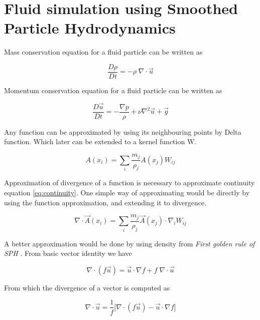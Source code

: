 \chapter{Fluid simulation using Smoothed Particle Hydrodynamics}
\label{cha:fluid-simul-using}

Mass conservation equation for a fluid particle can be written as

\begin{equation}
  \label{eq:continuity}
  \frac{D\rho}{Dt} = - \rho \; \nabla \cdot \vec{u}
\end{equation}



Momentum conservation equation for a fluid particle can be written as

\begin{equation}
  \label{eq:momentum}
  \frac{D\vec{u}}{Dt} = - \frac{\nabla p}{\rho} + \nu
  \nabla^2{\vec{u}} + \vec{g}
\end{equation}



Any function can be approximated by using its neighbouring points by Delta
function. Which later can be extended to a kernel function W.



\begin{equation}
  \label{eq:f_app}
  A(x_i) = \sum_i \frac{m_j}{\rho_j} A(x_j) W_{ij}
\end{equation}


Approximation of divergence of a function is necessary to approximate
continuity equation \eqref{eq:continuity}.  One simple way of approximating would
be directly by using the function approximation, and extending it to divergence.

\begin{equation*}
  \nabla \cdot \vec{A}(x_i) = \sum_i \frac{m_j}{\rho_j}
  \vec{A}(x_j) \cdot \nabla_i W_{ij}
\end{equation*}

A better approximation would be done by using density from \textit{First golden rule
of SPH} \cite{monaghan-1992-smoot-partic-hydrod}.  From basic vector identity we
have

\begin{equation*}
  \nabla\cdot(f \vec{u}) = \vec{u} \cdot
  \nabla{f} + f \; \nabla \cdot \vec{u}
\end{equation*}

From which the divergence of a vector is computed as

\begin{equation*}
  \nabla \cdot \vec{u} = \frac{1}{f} \Big[\nabla\cdot(f
  \vec{u}) - \vec{u} \cdot \nabla{f} \Big]
\end{equation*}

